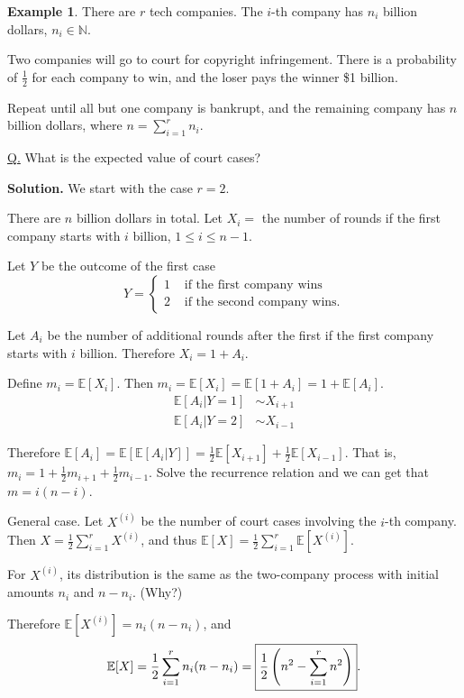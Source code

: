 \documentclass[a4paper,11pt]{amsbook}
\theoremstyle{definition}
\newtheorem{example}{\hspace{-2em} \color{darkblue} Example}[chapter]
\theoremstyle{remark}
\newcommand{\N}{\mathbb{N}}
\newcommand{\E}{\mathbb{E}}
\newcommand\0{\varnothing}
\begin{document}
\begin{example}
    There are $r$ tech companies. The $i$-th company has $n_i$ billion dollars, $n_i\in\N$.

    Two companies will go to court for copyright infringement.
    There is a probability of $\frac{1}{2}$ for each company to win, and the loser pays the winner \$1 billion.

    Repeat until all but one company is bankrupt, and the remaining company has $n$ billion dollars, 
    where $n=\sum_{i=1}^rn_i$.

    \noindent \underline{Q.} What is the expected value of court cases?

    \noindent \textbf{Solution.} We start with the case $r=2$.
    
    There are $n$ billion dollars in total. Let $X_i=$ the number of rounds 
    if the first company starts with $i$ billion, $1\leq i\leq n-1$.

    Let $Y$ be the outcome of the first case $$Y=\begin{cases}
        1 & \text{ if the first company wins} \\
        2 & \text{ if the second company wins}.
    \end{cases}$$

    Let $A_i$ be the number of additional rounds after the first if the first company starts with $i$ billion.
    Therefore $X_i=1+A_i$.

    Define $m_i=\E[X_i]$. Then $m_i=\E[X_i]=\E[1+A_i]=1+\E[A_i]$.
    \begin{align*}
        \E[A_i|Y=1]&\sim X_{i+1} \\
        \E[A_i|Y=2]&\sim X_{i-1}
    \end{align*}

    Therefore $\E[A_i]=\E[\E[A_i|Y]]=\frac12\E[X_{i+1}]+\frac12\E[X_{i-1}]$.
    That is, $m_i=1+\frac12m_{i+1}+\frac12m_{i-1}.$
    Solve the recurrence relation and we can get that $m=i(n-i)$.

    General case. Let $X^{(i)}$ be the number of court cases involving the $i$-th company.
    Then $X=\frac12\sum_{i=1}^rX^{(i)}$, and thus $\E[X]=\frac12\sum_{i=1}^r\E[X^{(i)}]$.
    
    For $X^{(i)}$, its distribution is the same as the two-company process with initial amounts $n_i$ and $n-n_i$. (Why?)

    Therefore $\E[X^{(i)}]=n_i(n-n_i)$, and $$\E[X]=\frac12\sum_{i=1}^rn_i(n-n_i)=\fbox{$\displaystyle\frac{1}{2}\left(n^2-\sum_{i=1}^rn^2\right)$}.$$
\end{example}
\end{document}
